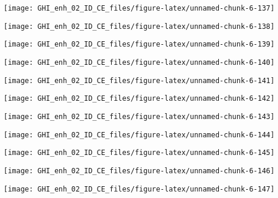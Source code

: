 \documentclass[
  10pt,
  a4paper,oneside]{article}
\begin{document}
\begin{center}\texttt{[image: GHI\_enh\_02\_ID\_CE\_files/figure-latex/unnamed-chunk-6-137]} \end{center}

\begin{center}\texttt{[image: GHI\_enh\_02\_ID\_CE\_files/figure-latex/unnamed-chunk-6-138]} \end{center}

\begin{center}\texttt{[image: GHI\_enh\_02\_ID\_CE\_files/figure-latex/unnamed-chunk-6-139]} \end{center}

\begin{center}\texttt{[image: GHI\_enh\_02\_ID\_CE\_files/figure-latex/unnamed-chunk-6-140]} \end{center}

\begin{center}\texttt{[image: GHI\_enh\_02\_ID\_CE\_files/figure-latex/unnamed-chunk-6-141]} \end{center}

\begin{center}\texttt{[image: GHI\_enh\_02\_ID\_CE\_files/figure-latex/unnamed-chunk-6-142]} \end{center}

\begin{center}\texttt{[image: GHI\_enh\_02\_ID\_CE\_files/figure-latex/unnamed-chunk-6-143]} \end{center}

\begin{center}\texttt{[image: GHI\_enh\_02\_ID\_CE\_files/figure-latex/unnamed-chunk-6-144]} \end{center}

\begin{center}\texttt{[image: GHI\_enh\_02\_ID\_CE\_files/figure-latex/unnamed-chunk-6-145]} \end{center}

\begin{center}\texttt{[image: GHI\_enh\_02\_ID\_CE\_files/figure-latex/unnamed-chunk-6-146]} \end{center}

\begin{center}\texttt{[image: GHI\_enh\_02\_ID\_CE\_files/figure-latex/unnamed-chunk-6-147]} \end{center}
\end{document}
